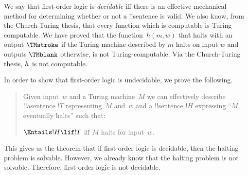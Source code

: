 \documentclass[../../../include/open-logic-section]{subfiles}
\begin{document}

We say that first-order logic is \emph{decidable} iff there is an effective
mechanical method for determining whether or not a !!{sentence} is
valid. We also know, from the Church-Turing thesis, that every
function which is computable is Turing computable. We have proved that
the function~$h(m,w)$ that halts with an output $\TMstroke$ if the
Turing-machine described by $m$ halts on input $w$ and outputs
$\TMblank$ otherwise, is not Turing-computable. Via the Church-Turing
thesis, $h$~is not computable.

In order to show that first-order logic is undecidable, we prove the following.

\begin{quote}
Given input~$w$ and a Turing machine~$M$ we can effectively describe
!!a{sentence} $!T$ representing~$M$ and~$w$ and a !!{sentence} $!H$
expressing ``$M$ eventually halts'' such that:
\begin{center}
  $\Entails !H \lif !T$ iff $M$ halts for input~$w$.
\end{center}
\end{quote}

This gives us the theorem that if first-order logic is decidable, then
the halting problem is solvable. However, we already know that the
halting problem is not solvable.  Therefore, first-order logic is not
decidable.
\end{document}
